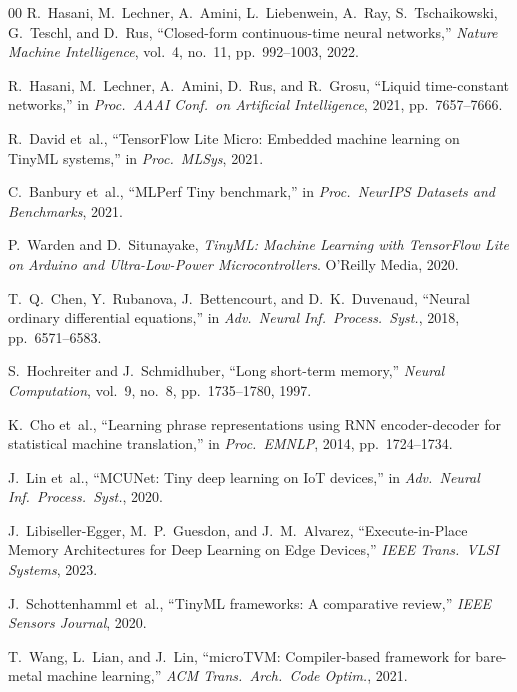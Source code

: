 \documentclass[conference]{IEEEtran}
\begin{document}
\begin{thebibliography}{00}
  R.~Hasani, M.~Lechner, A.~Amini, L.~Liebenwein, A.~Ray, S.~Tschaikowski,
  G.~Teschl, and D.~Rus, ``Closed-form continuous-time neural networks,''
  \textit{Nature Machine Intelligence}, vol.~4, no.~11, pp.~992--1003, 2022.

  R.~Hasani, M.~Lechner, A.~Amini, D.~Rus, and R.~Grosu,
  ``Liquid time-constant networks,''
  in \textit{Proc.\ AAAI Conf.\ on Artificial Intelligence}, 2021,
  pp.~7657--7666.

  R.~David et~al., ``TensorFlow Lite Micro: Embedded machine learning on
  TinyML systems,'' in \textit{Proc.\ MLSys}, 2021.

  C.~Banbury et~al., ``MLPerf Tiny benchmark,''
  in \textit{Proc.\ NeurIPS Datasets and Benchmarks}, 2021.

  P.~Warden and D.~Situnayake, \textit{TinyML: Machine Learning with
  TensorFlow Lite on Arduino and Ultra-Low-Power Microcontrollers}.
  O'Reilly Media, 2020.

  T.~Q.~Chen, Y.~Rubanova, J.~Bettencourt, and D.~K.~Duvenaud,
  ``Neural ordinary differential equations,''
  in \textit{Adv.\ Neural Inf.\ Process.\ Syst.}, 2018, pp.~6571--6583.

  S.~Hochreiter and J.~Schmidhuber,
  ``Long short-term memory,''
  \textit{Neural Computation}, vol.~9, no.~8, pp.~1735--1780, 1997.

  K.~Cho et~al.,
  ``Learning phrase representations using RNN encoder-decoder for statistical
  machine translation,''
  in \textit{Proc.\ EMNLP}, 2014, pp.~1724--1734.

  J.~Lin et~al.,
  ``MCUNet: Tiny deep learning on IoT devices,''
  in \textit{Adv.\ Neural Inf.\ Process.\ Syst.}, 2020.

  J.~Libiseller-Egger, M.~P.~Guesdon, and J.~M.~Alvarez,
  ``Execute-in-Place Memory Architectures for Deep Learning on Edge Devices,''
  \textit{IEEE Trans.\ VLSI Systems}, 2023.

  J.~Schottenhamml et~al.,
  ``TinyML frameworks: A comparative review,''
  \textit{IEEE Sensors Journal}, 2020.

  T.~Wang, L.~Lian, and J.~Lin,
  ``microTVM: Compiler-based framework for bare-metal machine learning,''
  \textit{ACM Trans.\ Arch.\ Code Optim.}, 2021.
\end{thebibliography}
\end{document}
